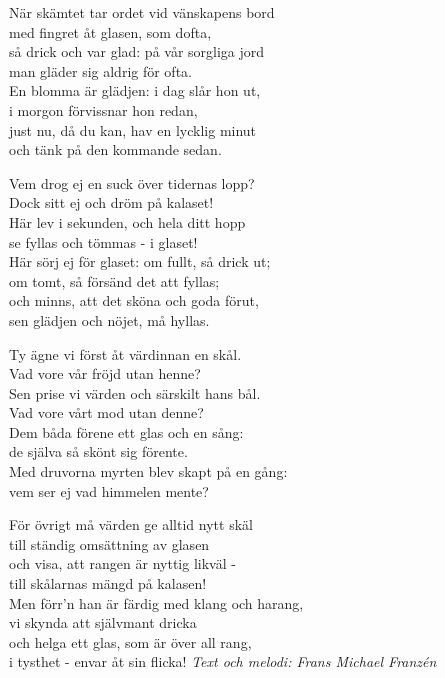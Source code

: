 \vspace{10pt}
\par
När skämtet tar ordet vid vänskapens bord\\
med fingret åt glasen, som dofta,\\
så drick och var glad: på vår sorgliga jord\\
man gläder sig aldrig för ofta.\\
En blomma är glädjen: i dag slår hon ut,\\
i morgon förvissnar hon redan,\\
just nu, då du kan, hav en lycklig minut\\
och tänk på den kommande sedan.\par
\vspace{10pt}
Vem drog ej en suck över tidernas lopp?\\
Dock sitt ej och dröm på kalaset!\\
Här lev i sekunden, och hela ditt hopp\\
se fyllas och tömmas - i glaset!\\
Här sörj ej för glaset: om fullt, så drick ut;\\
om tomt, så försänd det att fyllas;\\
och minns, att det sköna och goda förut,\\
sen glädjen och nöjet, må hyllas.\par
\vspace{10pt}
Ty ägne vi först åt värdinnan en skål.\\
Vad vore vår fröjd utan henne?\\
Sen prise vi värden och särskilt hans bål.\\
Vad vore vårt mod utan denne?\\
Dem båda förene ett glas och en sång:\\
de själva så skönt sig förente.\\
Med druvorna myrten blev skapt på en gång:\\
vem ser ej vad himmelen mente?\par
\vspace{10pt}
För övrigt må värden ge alltid nytt skäl\\
till ständig omsättning av glasen\\
och visa, att rangen är nyttig likväl -\\
till skålarnas mängd på kalasen!\\
Men förr'n han är färdig med klang och harang,\\
vi skynda att självmant dricka\\
och helga ett glas, som är över all rang,\\
i tysthet - envar åt sin flicka!
\vspace{10pt}
{\footnotesize\textit{Text och melodi: Frans Michael Franzén}}
